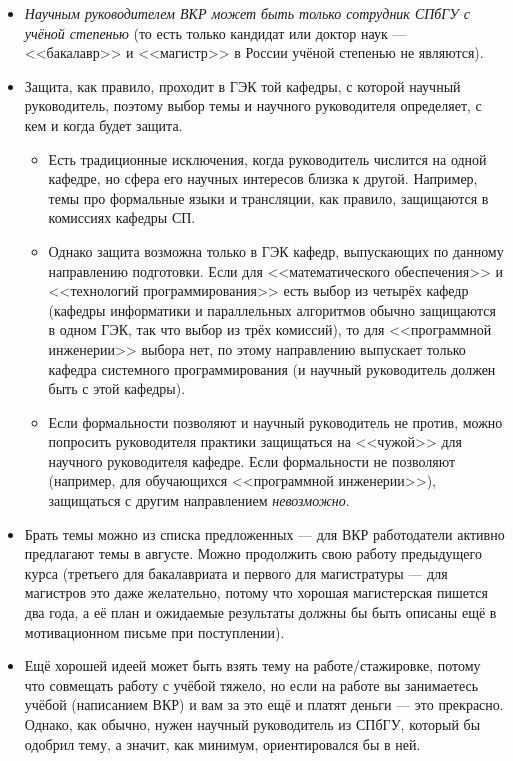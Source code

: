 \documentclass{article}
\begin{document}
\begin{itemize}
    \item \emph{Научным руководителем ВКР может быть только сотрудник СПбГУ с учёной степенью} (то есть только кандидат или доктор наук --- <<бакалавр>> и <<магистр>> в России учёной степенью не являются).
    \item Защита, как правило, проходит в ГЭК той кафедры, с которой научный руководитель, поэтому выбор темы и научного руководителя определяет, с кем и когда будет защита.
    \begin{itemize}
        \item Есть традиционные исключения, когда руководитель числится на одной кафедре, но сфера его научных интересов близка к другой. Например, темы про формальные языки и трансляции, как правило, защищаются в комиссиях кафедры СП.
        \item Однако защита возможна только в ГЭК кафедр, выпускающих по данному направлению подготовки. Если для <<математического обеспечения>> и <<технологий программирования>> есть выбор из четырёх кафедр (кафедры информатики и параллельных алгоритмов обычно защищаются в одном ГЭК, так что выбор из трёх комиссий), то для <<программной инженерии>> выбора нет, по этому направлению выпускает только кафедра системного программирования (и научный руководитель должен быть с этой кафедры).
        \item Если формальности позволяют и научный руководитель не против, можно попросить руководителя практики защищаться на <<чужой>> для научного руководителя кафедре. Если формальности не позволяют (например, для обучающихся <<программной инженерии>>), защищаться с другим направлением \emph{невозможно}.
    \end{itemize}
    \item Брать темы можно из списка предложенных --- для ВКР работодатели активно предлагают темы в августе. Можно продолжить свою работу предыдущего курса (третьего для бакалавриата и первого для магистратуры --- для магистров это даже желательно, потому что хорошая магистерская пишется два года, а её план и ожидаемые результаты должны бы быть описаны ещё в мотивационном письме при поступлении). 
    \item Ещё хорошей идеей может быть взять тему на работе/стажировке, потому что совмещать работу с учёбой тяжело, но если на работе вы занимаетесь учёбой (написанием ВКР) и вам за это ещё и платят деньги --- это прекрасно. Однако, как обычно, нужен научный руководитель из СПбГУ, который бы одобрил тему, а значит, как минимум, ориентировался бы в ней.

\end{itemize}
\end{document}
